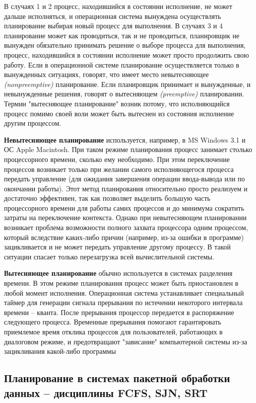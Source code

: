 В случаях 1 и 2 процесс, находившийся в состоянии исполнение, не может дальше исполняться, и операционная система вынуждена осуществлять планирование выбирая новый процесс для выполнения. В случаях 3 и 4 планирование может как проводиться, так и не проводиться, планировщик не вынужден обязательно принимать решение о выборе процесса для выполнения, процесс, находившийся в состоянии исполнение может просто продолжить свою работу. Если в операционной системе планирование осуществляется только в вынужденных ситуациях, говорят, что имеет место невытесняющее \textit{(nonpreemptive)} планирование. Если планировщик принимает и вынужденные, и невынужденные решения, говорят о вытесняющем \textit{(preemptive)} планировании. Термин "вытесняющее планирование" возник потому, что исполняющийся процесс помимо своей воли может быть вытеснен из состояния исполнение другим процессом.

\textbf{Невытесняющее планирование} используется, например, в MS Windows 3.1 и ОС Apple Macintosh. При таком режиме планирования процесс занимает столько процессорного времени, сколько ему необходимо. При этом переключение процессов возникает только при желании самого исполняющегося процесса передать управление (для ожидания завершения операции ввода-вывода или по окончании работы). Этот метод планирования относительно просто реализуем и достаточно эффективен, так как позволяет выделить большую часть процессорного времени для работы самих процессов и до минимума сократить затраты на переключение контекста. Однако при невытесняющем планировании возникает проблема возможности полного захвата процессора одним процессом, который вследствие каких-либо причин (например, из-за ошибки в программе) зацикливается и не может передать управление другому процессу. В такой ситуации спасает только перезагрузка всей вычислительной системы.

\textbf{Вытесняющее планирование} обычно используется в системах разделения времени. В этом режиме планирования процесс может быть приостановлен в любой момент исполнения. Операционная система устанавливает специальный таймер для генерации сигнала прерывания по истечении некоторого интервала времени – кванта. После прерывания процессор передается в распоряжение следующего процесса. Временные прерывания помогают гарантировать приемлемое время отклика процессов для пользователей, работающих в диалоговом режиме, и предотвращают "зависание" компьютерной системы из-за зацикливания какой-либо программы
\newpage
\subsection{Планирование в системах пакетной обработки данных – дисциплины FCFS, SJN, SRT}

